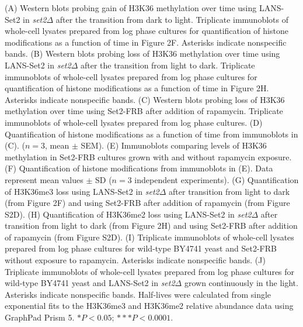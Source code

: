 \documentclass[11pt]{biorxiv}
\newcommand{\setdelt}{\emph{set2$\Delta$}\xspace}
\begin{document}
\noindent (A) Western blots probing gain of H3K36 methylation over time using LANS-Set2 in \setdelt after the transition from dark to light. Triplicate immunoblots of whole-cell lysates prepared from log phase cultures for quantification of histone modifications as a function of time in Figure 2F. Asterisks indicate nonspecific bands. (B) Western blots probing loss of H3K36 methylation over time using LANS-Set2 in \setdelt after the transition from light to dark. Triplicate immunoblots of whole-cell lysates prepared from log phase cultures for quantification of histone modifications as a function of time in Figure 2H. Asterisks indicate nonspecific bands. (C) Western blots probing loss of H3K36 methylation over time using Set2-FRB after addition of rapamycin. Triplicate immunoblots of whole-cell lysates prepared from log phase cultures. (D) Quantification of histone modifications as a function of time from immunoblots in (C). ($n = 3$, mean $\pm$ SEM). (E) Immunoblots comparing levels of H3K36 methylation in Set2-FRB cultures grown with and without rapamycin exposure. (F) Quantification of histone modifications from immunoblots in (E). Data represent mean values $\pm$ SD ($n = 3$ independent experiments). (G) Quantification of H3K36me3 loss using LANS-Set2 in \setdelt after transition from light to dark (from Figure 2F) and using Set2-FRB after addition of rapamycin (from Figure S2D). (H) Quantification of H3K36me2 loss using LANS-Set2 in \setdelt after transition from light to dark (from Figure 2H) and using Set2-FRB after addition of rapamycin (from Figure S2D). (I) Triplicate immunoblots of whole-cell lysates prepared from log phase cultures for wild-type BY4741 yeast and Set2-FRB without exposure to rapamycin. Asterisks indicate nonspecific bands. (J) Triplicate immunoblots of whole-cell lysates prepared from log phase cultures for wild-type BY4741 yeast and LANS-Set2 in \setdelt grown continuously in the light. Asterisks indicate nonspecific bands. Half-lives were calculated from single exponential fits to the H3K36me3 and H3K36me2 relative abundance data using GraphPad Prism 5. $*P < 0.05$; $***P < 0.0001$. \\

\clearpage
\end{document}
